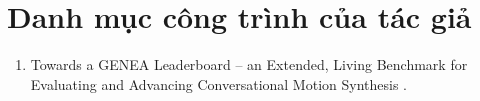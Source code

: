 \chapter*{Danh mục công trình của tác giả}
\label{AppendixAuthor}

\begin{enumerate}
\item Towards a GENEA Leaderboard -- an Extended, Living Benchmark for Evaluating and Advancing Conversational Motion Synthesis \cite{nagy2024towards}.
\end{enumerate}